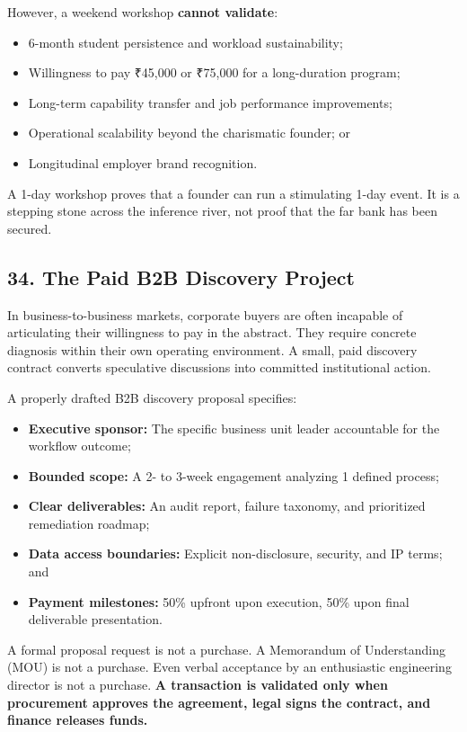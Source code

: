 However, a weekend workshop \textbf{cannot validate}:
\begin{itemize}
    \item 6-month student persistence and workload sustainability;
    \item Willingness to pay ₹45,000 or ₹75,000 for a long-duration program;
    \item Long-term capability transfer and job performance improvements;
    \item Operational scalability beyond the charismatic founder; or
    \item Longitudinal employer brand recognition.
\end{itemize}

A 1-day workshop proves that a founder can run a stimulating 1-day event. It is a stepping stone across the inference river, not proof that the far bank has been secured.

\subsection*{34. The Paid B2B Discovery Project}

In business-to-business markets, corporate buyers are often incapable of articulating their willingness to pay in the abstract. They require concrete diagnosis within their own operating environment. A small, paid discovery contract converts speculative discussions into committed institutional action.

A properly drafted B2B discovery proposal specifies:
\begin{itemize}
    \item \textbf{Executive sponsor:} The specific business unit leader accountable for the workflow outcome;
    \item \textbf{Bounded scope:} A 2- to 3-week engagement analyzing 1 defined process;
    \item \textbf{Clear deliverables:} An audit report, failure taxonomy, and prioritized remediation roadmap;
    \item \textbf{Data access boundaries:} Explicit non-disclosure, security, and IP terms; and
    \item \textbf{Payment milestones:} 50\% upfront upon execution, 50\% upon final deliverable presentation.
\end{itemize}

A formal proposal request is not a purchase. A Memorandum of Understanding (MOU) is not a purchase. Even verbal acceptance by an enthusiastic engineering director is not a purchase. \textbf{A transaction is validated only when procurement approves the agreement, legal signs the contract, and finance releases funds.}

